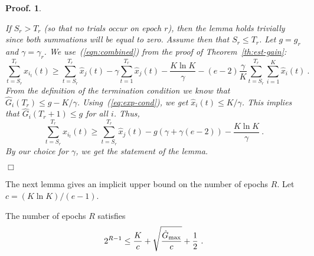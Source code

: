 \documentclass[12pt]{article}
\newcommand{\x}[2]{x_{#1}({#2})}
\newcommand{\Gh}[1]{\hat{G}_{#1}}
\newcommand{\Ghbest}{\hat{G}_{\rm max}}
\newcommand{\hx}[2]{\hat{x}_{#1}(#2)}
\newtheorem{pproof}{Proof.}
\newenvironment{proof}{
\begin{pproof}
        \begin{rm}\begin{rm}}{
        \hspace*{\fill} $\Box$
        \end{rm}\end{rm}
        \end{pproof}
}
\begin{document}
\begin{proof}
If $S_r > T_r$ (so that no trials occur on epoch $r$), then the lemma
holds trivially since both summations will be equal to zero.
Assume then that $S_r \leq T_r$.
Let $g=g_r$ and $\gamma = \gamma_r$.
We use~(\ref{eqn:combined}) from the proof of
Theorem~\ref{th:est-gain}:
\[
\sum_{t=S_r}^{T_r} \x{i_t}{t}
        \geq
  \sum_{t=S_r}^{T_r} \hx{j}{t}
  - \gamma \sum_{t=1}^{T_r} \hx{j}{t}
  - \frac{K\ln K}{\gamma}
  - (e-2)\frac{\gamma}{K}\sum_{t=S_r}^{T_r}\sum_{i=1}^K \hx{i}{t}~.
\]
 From the definition of the
termination condition we know that $\Gh{i}(T_r) \leq g - K/\gamma$.
Using~(\ref{eq:exp-cond}), we get $\hx{i}{t} \leq K/\gamma$.
This implies that $\Gh{i}(T_r+1) \leq g$ for all $i$.
Thus,
\[
\sum_{t=S_r}^{T_r} \x{i_t}{t}
 \geq 
  \sum_{t=S_r}^{T_r} \hx{j}{t}
  - g \left(\gamma + \gamma(e-2)\right)
  - \frac{K \ln K}{\gamma}~.
\]
By our choice for $\gamma$, we get the statement of the lemma.
\end{proof}
%
The next lemma gives an implicit upper bound on the number of epochs
$R$.
Let $c = (K \ln K)/(e-1)$.

\begin{lemma} \label{lemma:no-of-rounds}
The number of epochs $R$ satisfies
\[ 2^{R-1} \leq \frac{K}{c} + \sqrt{\frac{\Ghbest}{c}} + \frac{1}{2}~.
\]
\end{lemma}
\end{document}
